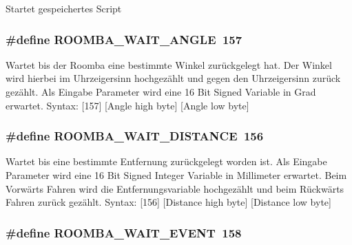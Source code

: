 Startet gespeichertes Script \hypertarget{group__roomba__commands__script_ga6f379b056533fe8ed77e7b92018a430b}{
\subsubsection[{R\-O\-O\-M\-B\-A\-\_\-\-W\-A\-I\-T\-\_\-\-A\-N\-G\-L\-E}]{\setlength{\rightskip}{0pt plus 5cm}\#define R\-O\-O\-M\-B\-A\-\_\-\-W\-A\-I\-T\-\_\-\-A\-N\-G\-L\-E~157}}\label{group__roomba__commands__script_ga6f379b056533fe8ed77e7b92018a430b}
Wartet bis der Roomba eine bestimmte Winkel zurückgelegt hat. Der Winkel wird hierbei im Uhrzeigersinn hochgezählt und gegen den Uhrzeigersinn zurück gezählt. Als Eingabe Parameter wird eine 16 Bit Signed Variable in Grad erwartet. Syntax\-: \mbox{[}157\mbox{]} \mbox{[}Angle high byte\mbox{]} \mbox{[}Angle low byte\mbox{]} \hypertarget{group__roomba__commands__script_ga909e911073bb99a67c67fb879f7f9e33}{
\subsubsection[{R\-O\-O\-M\-B\-A\-\_\-\-W\-A\-I\-T\-\_\-\-D\-I\-S\-T\-A\-N\-C\-E}]{\setlength{\rightskip}{0pt plus 5cm}\#define R\-O\-O\-M\-B\-A\-\_\-\-W\-A\-I\-T\-\_\-\-D\-I\-S\-T\-A\-N\-C\-E~156}}\label{group__roomba__commands__script_ga909e911073bb99a67c67fb879f7f9e33}
Wartet bis eine bestimmte Entfernung zurückgelegt worden ist. Als Eingabe Parameter wird eine 16 Bit Signed Integer Variable in Millimeter erwartet. Beim Vorwärts Fahren wird die Entfernungsvariable hochgezählt und beim Rückwärts Fahren zurück gezählt. Syntax\-: \mbox{[}156\mbox{]} \mbox{[}Distance high byte\mbox{]} \mbox{[}Distance low byte\mbox{]} \hypertarget{group__roomba__commands__script_gaacbdc16c0a8a665126403d53c976199f}{
\subsubsection[{R\-O\-O\-M\-B\-A\-\_\-\-W\-A\-I\-T\-\_\-\-E\-V\-E\-N\-T}]{\setlength{\rightskip}{0pt plus 5cm}\#define R\-O\-O\-M\-B\-A\-\_\-\-W\-A\-I\-T\-\_\-\-E\-V\-E\-N\-T~158}}\label{group__roomba__commands__script_gaacbdc16c0a8a665126403d53c976199f}
